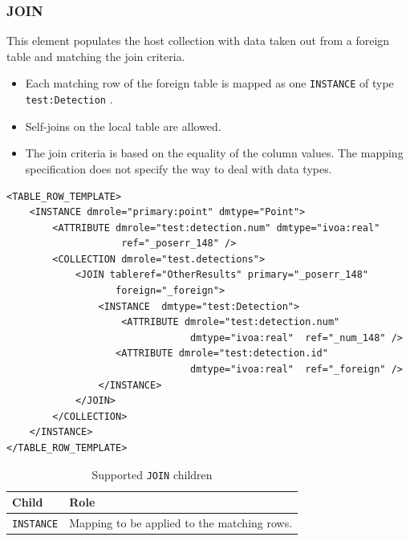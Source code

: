 \documentclass[11pt,a4paper]{ivoa}
\begin{document}
%
%
\FloatBarrier
\subsubsection{JOIN}
This element populates the host collection with data taken out from a foreign table and matching the join criteria.

\begin{itemize}
    \item Each matching row of the foreign table is mapped as  one \texttt{INSTANCE} of type \texttt{test:Detection} .
    \item Self-joins  on the local table are allowed.
    \item The join criteria is based on the equality of the column values. 
             The mapping specification does not specify the way to deal with data types.
\end{itemize}

\begin{lstlisting}[caption={JOIN example},style=XML]
<TABLE_ROW_TEMPLATE>
    <INSTANCE dmrole="primary:point" dmtype="Point">
        <ATTRIBUTE dmrole="test:detection.num" dmtype="ivoa:real"
                    ref="_poserr_148" />
        <COLLECTION dmrole="test.detections">
            <JOIN tableref="OtherResults" primary="_poserr_148"
                   foreign="_foreign">
                <INSTANCE  dmtype="test:Detection">
                    <ATTRIBUTE dmrole="test:detection.num" 
                                dmtype="ivoa:real"  ref="_num_148" />
                   <ATTRIBUTE dmrole="test:detection.id" 
                                dmtype="ivoa:real"  ref="_foreign" />
                </INSTANCE>
            </JOIN>
        </COLLECTION>
    </INSTANCE>
</TABLE_ROW_TEMPLATE>
\end{lstlisting}


\begin{table}[hbtp]
\small
\centering
\begin{tabulary}{\linewidth}{|L|J|}
\hline
    \textbf{Child} &
    \textbf{Role} \\
\hline \hline
     \texttt{INSTANCE}    &
     Mapping to be applied to the matching rows.  \\       
\hline
\end{tabulary}
     \caption{Supported  \texttt{JOIN} children} 
     \label{tbl:join-children}
\end{table}
\end{document}
